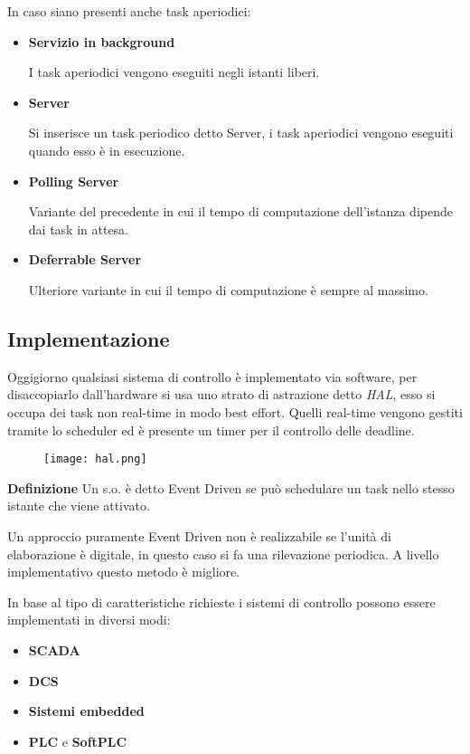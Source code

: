 \documentclass{article}
\newcommand{\df}[1]{\noindent\textbf{Definizione } #1.\newline}
\begin{document}
\noindent In caso siano presenti anche task aperiodici:
\begin{itemize}
    \item \textbf{Servizio in background}

        I task aperiodici vengono eseguiti negli istanti liberi.

    \item \textbf{Server}

        Si inserisce un task periodico detto Server, i task aperiodici vengono eseguiti quando esso è in esecuzione.

    \item \textbf{Polling Server}

        Variante del precedente in cui il tempo di computazione dell'istanza dipende dai task in attesa.

    \item \textbf{Deferrable Server}

        Ulteriore variante in cui il tempo di computazione è sempre al massimo.\newline
    
\end{itemize}

\newpage

\subsection{Implementazione}

Oggigiorno qualsiasi sistema di controllo è implementato via software, per disaccopiarlo dall'hardware si usa uno strato di astrazione detto \textit{HAL}, esso si occupa dei task non real-time in modo best effort. Quelli real-time vengono gestiti tramite lo scheduler ed è presente un timer per il controllo delle deadline.\newline

\begin{figure}[ht]
    \centering
    \texttt{[image: hal.png]}
\end{figure}

\df{Un s.o. è detto Event Driven se può schedulare un task nello stesso istante che viene attivato}

\noindent Un approccio puramente Event Driven non è realizzabile se l'unità di elaborazione è digitale, in questo caso si fa una rilevazione periodica. A livello implementativo questo metodo è migliore.\newline

\noindent In base al tipo di caratteristiche richieste i sistemi di controllo possono essere implementati in diversi modi:
\begin{itemize}
    \item \textbf{SCADA}
    \item \textbf{DCS}
    \item \textbf{Sistemi embedded}
    
    \item \textbf{PLC} e \textbf{SoftPLC}
\end{itemize}
\end{document}
